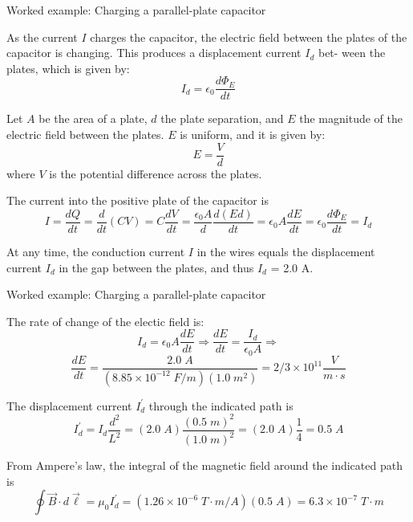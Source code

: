 {%
%
%

\begin{frame}{Worked example: Charging a parallel-plate capacitor}

  As the current $I$ charges the capacitor, the electric field between
  the plates of the capacitor is changing.
  This produces a displacement current $I_{d}$ bet- ween the plates,
  which is given by:
  \begin{equation*}
    I_d = \epsilon_0 \frac{d\Phi_{E}}{dt}
  \end{equation*}

  Let $A$ be the area of a plate, $d$ the plate separation,
  and $E$ the magnitude of the electric field between the plates.
  $E$ is uniform, and it is given by:
  \begin{equation*}
    E = \frac{V}{d}
  \end{equation*}
  where $V$ is the potential difference across the plates.

  The current into the positive plate of the capacitor is
  \begin{equation*}
    I = \frac{dQ}{dt} = \frac{d}{dt}(CV) = C \frac{dV}{dt}
      = \frac{\epsilon_0 A}{d} \frac{d(Ed)}{dt}
      = \epsilon_0 A \frac{dE}{dt} = \epsilon_0 \frac{d\Phi_{E}}{dt} = I_{d}
  \end{equation*}

  At any time, the conduction current $I$ in the wires equals
  the displacement current $I_{d}$ in the gap between the plates,
  and thus $I_{d}$ = 2.0 A.

\end{frame}

%
%
%

\begin{frame}{Worked example: Charging a parallel-plate capacitor}

  The rate of change of the electic field is:
  \begin{equation*}
    I_d = \epsilon_0 A \frac{dE}{dt} \Rightarrow
    \frac{dE}{dt} = \frac{I_d}{\epsilon_0 A} \Rightarrow
  \end{equation*}
  \begin{equation*}
    \frac{dE}{dt} = \frac{2.0 \; A}{(8.85 \times 10^{-12} \; F/m)(1.0 \; m^2)}
                  = 2/3 \times 10^{11} \frac{V}{m \cdot s}
  \end{equation*}

  The displacement current $I_d^\prime$ through the indicated path is
  \begin{equation*}
    I_d^\prime = I_d \frac{d^2}{L^2}
               = (2.0 \; A) \frac{(0.5 \; m)^2}{(1.0 \; m)^2}
               = (2.0 \; A) \frac{1}{4} = 0.5 \; A
  \end{equation*}

   From Ampere's law, the integral of the magnetic field around the indicated path is
   \begin{equation*}
      \oint \vec{B} \cdot d\vec{\ell}
         = \mu_0 I_d^\prime
         = (1.26 \times 10^{-6} \; T \cdot m / A) (0.5 \; A)
         = 6.3 \times 10^{-7} \; T \cdot m
   \end{equation*}

\end{frame}

} %
